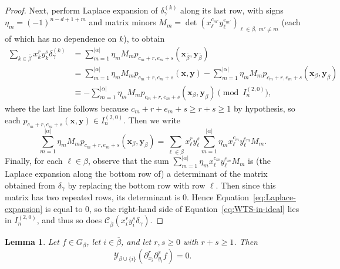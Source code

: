 \documentclass[11pt, noadjust, reqno]{amsart}
\newtheorem{lemma}[theorem]{Lemma}
\theoremstyle{definition}
\theoremstyle{remark}
\numberwithin{equation}{section}
\newcommand{\0}{\emptyset}
\newcommand{\cC}{\mathcal{C}}
\newcommand{\cY}{\mathcal{Y}}
\begin{document}
\begin{proof}
    Next, perform Laplace expansion of $\delta_\gamma^{(k)}$ along its last row, with signs $\eta_m = (-1)^{n-d+1+m}$ and matrix minors $M_m = \det(x_\ell^{c_{m'}}y_\ell^{e_{m'}})_{\ell \in \beta,\ m' \neq m}$ (each of which has no dependence on $k$), to obtain
    \begin{equation}\label{eq:WTS-in-ideal}
    \begin{aligned}
        \sum_{k \in {\overline{\beta}}} x_k^r y_k^s \delta_\gamma^{(k)} &= \sum_{m=1}^{|{\alpha}|} \eta_m M_m p_{c_m+r, e_m+s}(\bm{x}_{\overline{\beta}},\bm{y}_{\overline{\beta}})\\
        &= \sum_{m=1}^{|{\alpha}|} \eta_m M_m p_{c_m+r, e_m+s}(\bm{x},\bm{y}) - \sum_{m=1}^{|{\alpha}|} \eta_m M_m p_{c_m+r, e_m+s}(\bm{x}_\beta,\bm{y}_\beta)  \\
        &\equiv - \sum_{m=1}^{|{\alpha}|} \eta_m M_m p_{c_m+r, e_m+s}(\bm{x}_\beta,\bm{y}_\beta) \pmod {I_n^{(2,0)}}, 
    \end{aligned}
    \end{equation}
    where the last line follows because $c_m+r + e_m+s \geq r+s \geq 1$ by hypothesis, so each $p_{c_m+r, e_m+s}(\bm{x},\bm{y}) \in I_n^{(2,0)}$.
    Then we write
    \begin{equation}\label{eq:Laplace-expansion}
        \sum_{m=1}^{|{\alpha}|} \eta_m M_m p_{c_m+r, e_m+s}(\bm{x}_\beta,\bm{y}_\beta) = \sum_{\ell \in \beta} x_\ell^{r} y_\ell^{s} \sum_{m=1}^{|{\alpha}|} \eta_m x_\ell^{c_m} y_\ell^{e_m} M_m. 
    \end{equation}
    Finally, for each $\ell \in \beta$, observe that the sum $\sum_{m=1}^{|{\alpha}|} \eta_m x_\ell^{c_m} y_\ell^{e_m} M_m$ is (the Laplace expansion along the bottom row of) a determinant of the matrix obtained from $\delta_\gamma$ by replacing the bottom row with row $\ell$. 
    Then since this matrix has two repeated rows, its determinant is $0$. 
    Hence Equation~\eqref{eq:Laplace-expansion} is equal to $0$, so the right-hand side of Equation~\eqref{eq:WTS-in-ideal} lies in $I_n^{(2,0)}$, and thus so does $\cC_{\overline{\beta}}(x_i^r y_i^s \delta_\gamma)$.
\end{proof}

\begin{lemma}\label{lem:key}
    Let $f \in G_\beta$, let $i \in \overline{\beta}$, and let $r,s \geq 0$  with $r+s \geq 1$. Then
    \begin{equation*}
        \cY_{\beta \cup \{i\}} (\partial_{x_i}^r \partial_{y_i}^s f) = 0.
    \end{equation*}
\end{lemma}
\end{document}
